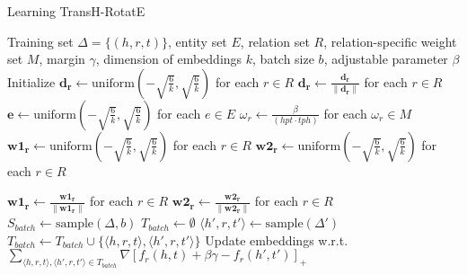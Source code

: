 \documentclass{article}
\begin{document}
\begin{algorithm}
\caption{Learning TransH-RotatE}
\begin{algorithmic}[1]
\Require Training set $\Delta = \{ (h, r, t) \}$, entity set $E$, relation set $R$, relation-specific weight set $M$, margin $\gamma$, dimension of embeddings $k$, batch size $b$, adjustable parameter $\beta$
\State Initialize $\mathbf{d_r} \leftarrow \text{uniform}\left(-\sqrt{\frac{6}{k}}, \sqrt{\frac{6}{k}}\right)$ for each $r \in R$ 
\State $\mathbf{d_r} \leftarrow \frac{\mathbf{d_r}}{\| \mathbf{d_r} \|}$ for each $r \in R$ 
\State $\mathbf{e} \leftarrow \text{uniform}\left(-\sqrt{\frac{6}{k}}, \sqrt{\frac{6}{k}}\right)$ for each $e \in E$ 
\State $\omega_r \leftarrow \frac{\beta}{(hpt \cdot tph)}$ for each $\omega_r \in M$ 
\State $\mathbf{w1_r} \leftarrow \text{uniform}\left(-\sqrt{\frac{6}{k}}, \sqrt{\frac{6}{k}}\right)$ for each $r \in R$ 
\State $\mathbf{w2_r} \leftarrow \text{uniform}\left(-\sqrt{\frac{6}{k}}, \sqrt{\frac{6}{k}}\right)$ for each $r \in R$ 

    \State $\mathbf{w1_r} \leftarrow \frac{\mathbf{w1_r}}{\| \mathbf{w1_r} \|}$ for each $r \in R$ 
    \State $\mathbf{w2_r} \leftarrow \frac{\mathbf{w2_r}}{\| \mathbf{w2_r} \|}$ for each $r \in R$ 
    \State $S_{batch} \leftarrow \text{sample}(\Delta, b)$ 
    \State $T_{batch} \leftarrow \emptyset$ 
        \State $\langle h', r, t' \rangle \leftarrow \text{sample}(\Delta')$ 
        \State $T_{batch} \leftarrow T_{batch} \cup \{\langle h, r, t \rangle, \langle h', r, t' \rangle\}$ 
    \EndFor
    \State Update embeddings w.r.t. $\sum_{\langle h, r, t \rangle, \langle h', r, t' \rangle \in T_{batch}} \nabla [ f_r(h, t) + \beta \gamma - f_r(h', t') ]_+$
\EndWhile

\end{algorithmic}
\end{algorithm}
\end{document}
